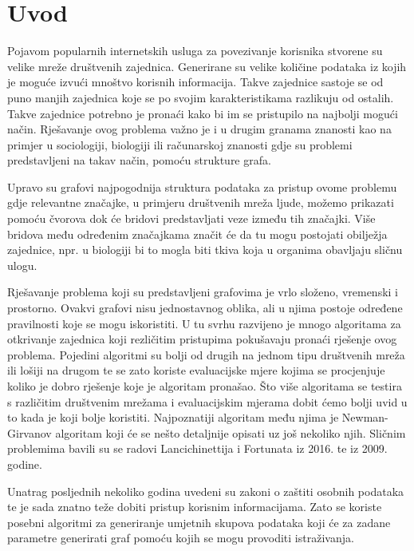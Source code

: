 \chapter{Uvod}

Pojavom popularnih internetskih usluga za povezivanje korisnika stvorene su velike mreže društvenih zajednica. Generirane su velike količine podataka iz kojih je moguće izvući mnoštvo korisnih informacija. Takve zajednice sastoje se od puno manjih zajednica koje se po svojim karakteristikama razlikuju od ostalih. Takve zajednice potrebno je pronaći kako bi im se pristupilo na najbolji mogući način. Rješavanje ovog problema važno je i u drugim granama znanosti kao na primjer u sociologiji, biologiji ili računarskoj znanosti gdje su problemi predstavljeni na takav način, pomoću strukture grafa. 

Upravo su grafovi najpogodnija struktura podataka za pristup ovome problemu gdje relevantne značajke, u primjeru društvenih mreža ljude, možemo prikazati pomoću čvorova dok će bridovi predstavljati veze između tih značajki. Više bridova među određenim značajkama značit će da tu mogu postojati obilježja zajednice, npr. u biologiji bi to mogla biti tkiva koja u organima obavljaju sličnu ulogu. 

Rješavanje problema koji su predstavljeni grafovima je vrlo složeno, vremenski i prostorno. Ovakvi grafovi nisu jednostavnog oblika, ali u njima postoje određene pravilnosti koje se mogu iskoristiti. U tu svrhu razvijeno je mnogo algoritama za otkrivanje zajednica koji rezličitim pristupima pokušavaju pronaći rješenje ovog problema. Pojedini algoritmi su bolji od drugih na jednom tipu društvenih mreža ili lošiji na drugom te se zato koriste evaluacijske mjere kojima se procjenjuje koliko je dobro rješenje koje je algoritam pronašao. Što više algoritama se testira s različitim društvenim mrežama i evaluacijskim mjerama dobit ćemo bolji uvid u to kada je koji bolje koristiti. Najpoznatiji algoritam među njima je Newman-Girvanov algoritam koji će se nešto detaljnije opisati uz još nekoliko njih. Sličnim problemima bavili su se radovi Lancichinettija i Fortunata \cite{fortunato2016community} iz 2016. te \cite{lancichinetti2009community} iz 2009. godine.

Unatrag posljednih nekoliko godina uvedeni su zakoni o zaštiti osobnih podataka te je sada znatno teže dobiti pristup korisnim informacijama. Zato se koriste posebni algoritmi za generiranje umjetnih skupova podataka koji će za zadane parametre generirati graf pomoću kojih se mogu provoditi istraživanja. 

